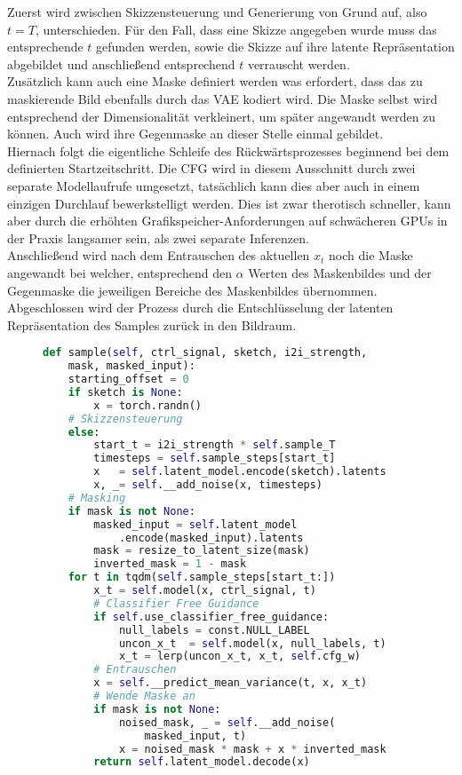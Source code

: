 Zuerst wird zwischen Skizzensteuerung und Generierung von Grund auf, also $t=T$, unterschieden. Für den Fall, dass eine Skizze angegeben wurde muss das entsprechende $t$ gefunden werden, sowie die Skizze auf ihre latente Repräsentation abgebildet und anschließend entsprechend $t$ verrauscht werden. \\ 
Zusätzlich kann auch eine Maske definiert werden was erfordert, dass das zu maskierende Bild ebenfalls durch das VAE kodiert wird. Die Maske selbst wird entsprechend der Dimensionalität verkleinert, um später angewandt werden zu können. Auch wird ihre Gegenmaske an dieser Stelle einmal gebildet. \\
Hiernach folgt die eigentliche Schleife des Rückwärtsprozesses beginnend bei dem definierten Startzeitschritt. Die CFG wird in diesem Ausschnitt durch zwei separate Modellaufrufe umgesetzt, tatsächlich kann dies aber auch in einem einzigen Durchlauf bewerkstelligt werden. Dies ist zwar therotisch schneller, kann aber durch die erhöhten Grafikspeicher-Anforderungen auf schwächeren GPUs in der Praxis langsamer sein, als zwei separate Inferenzen. \\
Anschließend wird nach dem Entrauschen des aktuellen $x_t$ noch die Maske angewandt bei welcher, entsprechend den $\alpha$ Werten des Maskenbildes und der Gegenmaske die jeweiligen Bereiche des Maskenbildes übernommen. \\
Abgeschlossen wird der Prozess durch die Entschlüsselung der latenten Repräsentation des Samples zurück in den Bildraum.
\begin{figure}[htbp]
\begin{lstlisting}[language=python]
def sample(self, ctrl_signal, sketch, i2i_strength,
    mask, masked_input):
    starting_offset = 0
    if sketch is None:
        x = torch.randn()
    # Skizzensteuerung
    else:
        start_t = i2i_strength * self.sample_T
        timesteps = self.sample_steps[start_t]
        x   = self.latent_model.encode(sketch).latents
        x, _= self.__add_noise(x, timesteps)
    # Masking 
    if mask is not None:
        masked_input = self.latent_model
            .encode(masked_input).latents
        mask = resize_to_latent_size(mask)
        inverted_mask = 1 - mask
    for t in tqdm(self.sample_steps[start_t:])  
        x_t = self.model(x, ctrl_signal, t)
        # Classifier Free Guidance 
        if self.use_classifier_free_guidance:       
            null_labels = const.NULL_LABEL
            uncon_x_t  = self.model(x, null_labels, t)
            x_t = lerp(uncon_x_t, x_t, self.cfg_w)
        # Entrauschen
        x = self.__predict_mean_variance(t, x, x_t)        
        # Wende Maske an
        if mask is not None:
            noised_mask, _ = self.__add_noise(
                masked_input, t) 
            x = noised_mask * mask + x * inverted_mask
        return self.latent_model.decode(x)
\end{lstlisting}
    \captionsetup{type=figure}
    \label{fig:ldm_sample}
\end{figure} \\
